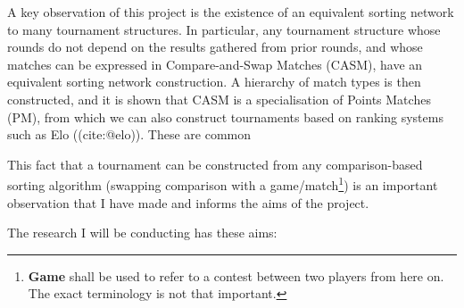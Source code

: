 \documentclass[a4,11pt,twoside,final]{article}
\begin{document}
A key observation of this project is the existence of an equivalent sorting
network to many tournament structures. In particular, any tournament structure
whose rounds do not depend on the results gathered from prior rounds, and whose
matches can be expressed in Compare-and-Swap Matches (CASM), have an equivalent
sorting network construction. A hierarchy of match types is then constructed,
and it is shown that CASM is a specialisation of Points Matches (PM), from which
we can also construct tournaments based on ranking systems such as Elo
((cite:@elo)). These are common

This fact that a tournament can be constructed from any comparison-based sorting
algorithm (swapping comparison with a game/match\footnote{\textbf{Game} shall be used to
refer to a contest between two players from here on. The exact terminology is
not that important.}) is an important observation that I have made and informs
the aims of the project.

The research I will be conducting has these aims:
\end{document}
